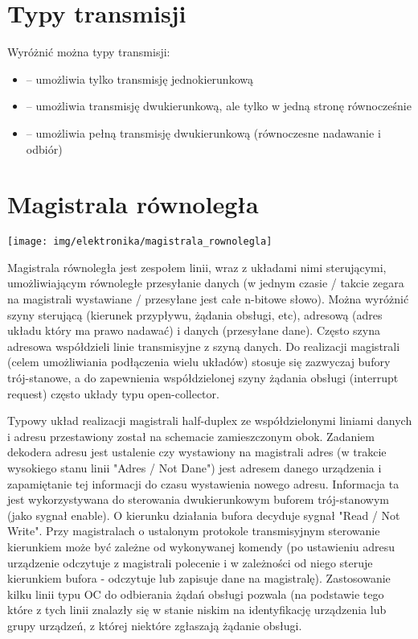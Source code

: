 \documentclass{pdfBooklets}
\begin{document}
\section{Typy transmisji}

Wyróżnić można typy transmisji:
\begin{itemize}
\item {} -- umożliwia tylko transmisję jednokierunkową
\item {} -- umożliwia transmisję dwukierunkową, ale tylko w jedną stronę równocześnie
\item {} -- umożliwia pełną transmisję dwukierunkową (równoczesne nadawanie i odbiór)
\end{itemize}

\section{Magistrala równoległa}

\begin{center}
    \texttt{[image: img/elektronika/magistrala\_rownolegla]}
\end{center}
Magistrala równoległa jest zespołem linii, wraz z układami nimi sterującymi, umożliwiającym równoległe przesyłanie danych (w jednym czasie / takcie zegara na magistrali wystawiane / przesyłane jest całe n-bitowe słowo).
Można wyróżnić szyny sterującą (kierunek przypływu, żądania obsługi, etc), adresową (adres układu który ma prawo nadawać) i danych (przesyłane dane). Często szyna adresowa współdzieli linie transmisyjne z szyną danych.
Do realizacji magistrali (celem umożliwiania podłączenia wielu układów) stosuje się zazwyczaj bufory trój-stanowe, a do zapewnienia współdzielonej szyny żądania obsługi (interrupt request) często układy typu open-collector.

Typowy układ realizacji magistrali half-duplex ze współdzielonymi liniami danych i adresu przestawiony został na schemacie zamieszczonym obok.
Zadaniem dekodera adresu jest ustalenie czy wystawiony na magistrali adres (w trakcie wysokiego stanu linii "Adres / Not Dane") jest adresem danego urządzenia i zapamiętanie tej informacji do czasu wystawienia nowego adresu. Informacja ta jest wykorzystywana do sterowania dwukierunkowym buforem trój-stanowym (jako sygnał enable).
O kierunku działania bufora decyduje sygnał "Read / Not Write". Przy magistralach o ustalonym protokole transmisyjnym sterowanie kierunkiem może być zależne od wykonywanej komendy (po ustawieniu adresu urządzenie odczytuje z magistrali polecenie i w zależności od niego steruje kierunkiem bufora - odczytuje lub zapisuje dane na magistralę).
Zastosowanie kilku linii typu OC do odbierania żądań obsługi pozwala (na podstawie tego które z tych linii znalazły się w stanie niskim na identyfikację urządzenia lub grupy urządzeń, z której niektóre zgłaszają żądanie obsługi.
\end{document}
